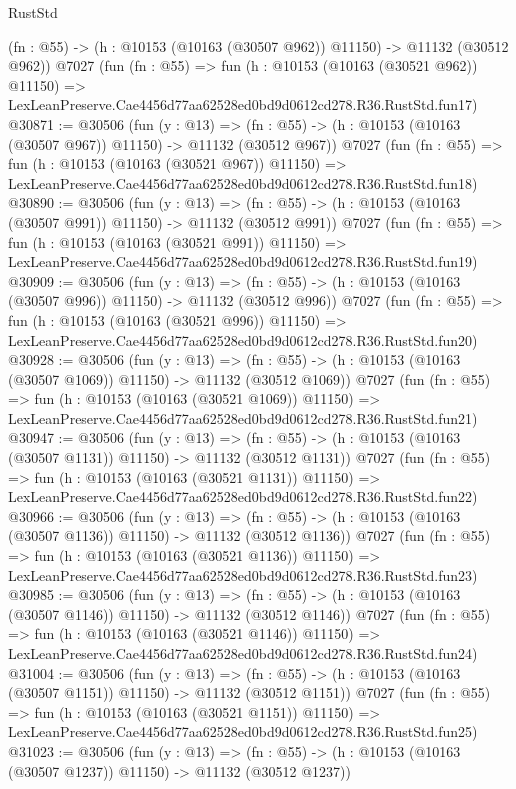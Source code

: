 \begin{lexlean}{RustStd}
\begin{coremodule}
    (fn : @55) -> (h : @10153 (@10163 (@30507 @962)) @11150) -> @11132 (@30512 @962))
    @7027
    (fun (fn : @55) =>
    fun (h : @10153 (@10163 (@30521 @962)) @11150) =>
    LexLeanPreserve.Cae4456d77aa62528ed0bd9d0612cd278.R36.RustStd.fun17)
@30871 := @30506
    (fun (y : @13) =>
    (fn : @55) -> (h : @10153 (@10163 (@30507 @967)) @11150) -> @11132 (@30512 @967))
    @7027
    (fun (fn : @55) =>
    fun (h : @10153 (@10163 (@30521 @967)) @11150) =>
    LexLeanPreserve.Cae4456d77aa62528ed0bd9d0612cd278.R36.RustStd.fun18)
@30890 := @30506
    (fun (y : @13) =>
    (fn : @55) -> (h : @10153 (@10163 (@30507 @991)) @11150) -> @11132 (@30512 @991))
    @7027
    (fun (fn : @55) =>
    fun (h : @10153 (@10163 (@30521 @991)) @11150) =>
    LexLeanPreserve.Cae4456d77aa62528ed0bd9d0612cd278.R36.RustStd.fun19)
@30909 := @30506
    (fun (y : @13) =>
    (fn : @55) -> (h : @10153 (@10163 (@30507 @996)) @11150) -> @11132 (@30512 @996))
    @7027
    (fun (fn : @55) =>
    fun (h : @10153 (@10163 (@30521 @996)) @11150) =>
    LexLeanPreserve.Cae4456d77aa62528ed0bd9d0612cd278.R36.RustStd.fun20)
@30928 := @30506
    (fun (y : @13) =>
    (fn : @55) -> (h : @10153 (@10163 (@30507 @1069)) @11150) -> @11132 (@30512 @1069))
    @7027
    (fun (fn : @55) =>
    fun (h : @10153 (@10163 (@30521 @1069)) @11150) =>
    LexLeanPreserve.Cae4456d77aa62528ed0bd9d0612cd278.R36.RustStd.fun21)
@30947 := @30506
    (fun (y : @13) =>
    (fn : @55) -> (h : @10153 (@10163 (@30507 @1131)) @11150) -> @11132 (@30512 @1131))
    @7027
    (fun (fn : @55) =>
    fun (h : @10153 (@10163 (@30521 @1131)) @11150) =>
    LexLeanPreserve.Cae4456d77aa62528ed0bd9d0612cd278.R36.RustStd.fun22)
@30966 := @30506
    (fun (y : @13) =>
    (fn : @55) -> (h : @10153 (@10163 (@30507 @1136)) @11150) -> @11132 (@30512 @1136))
    @7027
    (fun (fn : @55) =>
    fun (h : @10153 (@10163 (@30521 @1136)) @11150) =>
    LexLeanPreserve.Cae4456d77aa62528ed0bd9d0612cd278.R36.RustStd.fun23)
@30985 := @30506
    (fun (y : @13) =>
    (fn : @55) -> (h : @10153 (@10163 (@30507 @1146)) @11150) -> @11132 (@30512 @1146))
    @7027
    (fun (fn : @55) =>
    fun (h : @10153 (@10163 (@30521 @1146)) @11150) =>
    LexLeanPreserve.Cae4456d77aa62528ed0bd9d0612cd278.R36.RustStd.fun24)
@31004 := @30506
    (fun (y : @13) =>
    (fn : @55) -> (h : @10153 (@10163 (@30507 @1151)) @11150) -> @11132 (@30512 @1151))
    @7027
    (fun (fn : @55) =>
    fun (h : @10153 (@10163 (@30521 @1151)) @11150) =>
    LexLeanPreserve.Cae4456d77aa62528ed0bd9d0612cd278.R36.RustStd.fun25)
@31023 := @30506
    (fun (y : @13) =>
    (fn : @55) -> (h : @10153 (@10163 (@30507 @1237)) @11150) -> @11132 (@30512 @1237))

\end{coremodule}
\end{lexlean}
